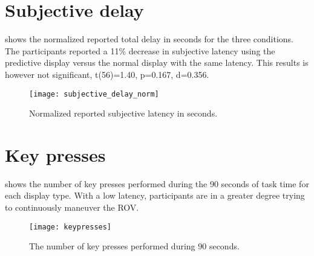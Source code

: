 \section{Subjective delay}

 shows the normalized reported total delay in seconds for the three conditions. The participants reported a 11\% decrease in subjective latency using the predictive display versus the normal display with the same latency. This results is however not significant, t(56)=1.40, p=0.167, d=0.356.


\begin{figure}[h!]
    \centering
    \texttt{[image: subjective\_delay\_norm]}
    \caption{Normalized reported subjective latency in seconds.}
    \label{subjective_delay_norm}
\end{figure}

\section{Key presses}

 shows the number of key presses performed during the 90 seconds of task time for each display type. With a low latency, participants are in a greater degree trying to continuously maneuver the ROV.

\begin{figure}[h!]
    \centering
    \texttt{[image: keypresses]}
    \caption{The number of key presses performed during 90 seconds.}
    \label{keypresses}
\end{figure}

